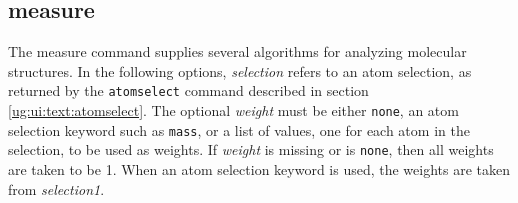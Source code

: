 
\subsection{measure}

The measure command supplies several algorithms for analyzing molecular 
structures.  In the following options, {\it selection} refers to an atom
selection, as returned by the {\tt atomselect} command described in section
\ref{ug:ui:text:atomselect}.  The optional {\it weight} must be either 
{\tt none}, an atom selection keyword such as {\tt mass}, or a list of values, 
one for each atom in the selection, to be used as weights.  If {\it weight} 
is missing or is {\tt none}, then all weights are taken to be 1.  When
an atom selection keyword is used, the weights are taken from {\it selection1}.

